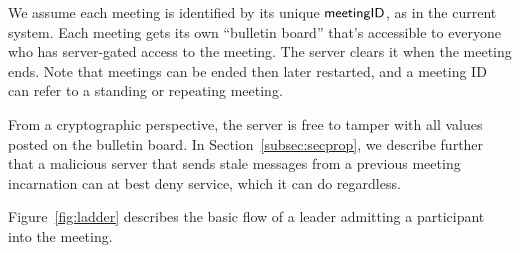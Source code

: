 We assume each meeting is identified by its unique ${\sf meetingID}$, as in the current system. Each
meeting gets its own ``bulletin board'' that's accessible to everyone who has server-gated access to
the meeting. The server clears it when the meeting ends. Note that meetings can be ended then later
restarted, and a meeting ID can refer to a standing or repeating meeting.

From a cryptographic perspective, the server is free to tamper with all values posted on the
bulletin board. In Section~\ref{subsec:secprop}, we describe further that a malicious server that
sends stale messages from a previous meeting incarnation can at best deny service, which it can do
regardless.

Figure~\ref{fig:ladder} describes the basic flow of a leader admitting a participant into the
meeting.

\def\Bob{Bob}
\def\MMR{Zoom MMR}
\def\Keyserver{Zoom Keyserver}
\def\Alice{Alice}

